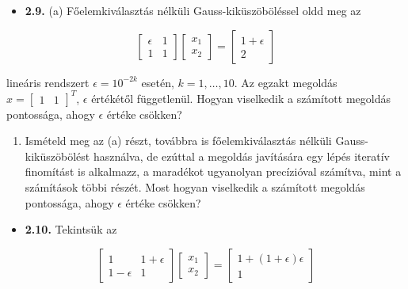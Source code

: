 \documentclass[
  magyar,
  11pt]{article}
\providecommand{\tightlist}{%
  \setlength{\itemsep}{0pt}\setlength{\parskip}{0pt}}
\begin{document}
\begin{itemize}
\tightlist
\item
  \textbf{2.9.} (a) Főelemkiválasztás nélküli Gauss-kiküszöböléssel oldd
  meg az
\end{itemize}

\[\begin{bmatrix} \epsilon & 1 \\ 1 & 1 \end{bmatrix} \begin{bmatrix} x_1 \\ x_2 \end{bmatrix} = \begin{bmatrix} 1+\epsilon \\ 2 \end{bmatrix}\]

lineáris rendszert \(\epsilon = 10^{-2k}\) esetén,
\(k = 1, \ldots, 10\). Az egzakt megoldás
\(x = \begin{bmatrix} 1 & 1 \end{bmatrix}^T\), \(\epsilon\) értékétől
függetlenül. Hogyan viselkedik a számított megoldás pontossága, ahogy
\(\epsilon\) értéke csökken?

\begin{enumerate}
\def\labelenumi{(\alph{enumi})}
\setcounter{enumi}{1}
\tightlist
\item
  Ismételd meg az (a) részt, továbbra is főelemkiválasztás nélküli
  Gauss-kiküszöbölést használva, de ezúttal a megoldás javítására egy
  lépés iteratív finomítást is alkalmazz, a maradékot ugyanolyan
  precízióval számítva, mint a számítások többi részét. Most hogyan
  viselkedik a számított megoldás pontossága, ahogy \(\epsilon\) értéke
  csökken?
\end{enumerate}

\begin{itemize}
\tightlist
\item
  \textbf{2.10.} Tekintsük az
\end{itemize}

\[\begin{bmatrix} 1 & 1+\epsilon \\ 1-\epsilon & 1 \end{bmatrix} \begin{bmatrix} x_1 \\ x_2 \end{bmatrix} = \begin{bmatrix} 1+(1+\epsilon)\epsilon \\ 1 \end{bmatrix}\]
\end{document}
